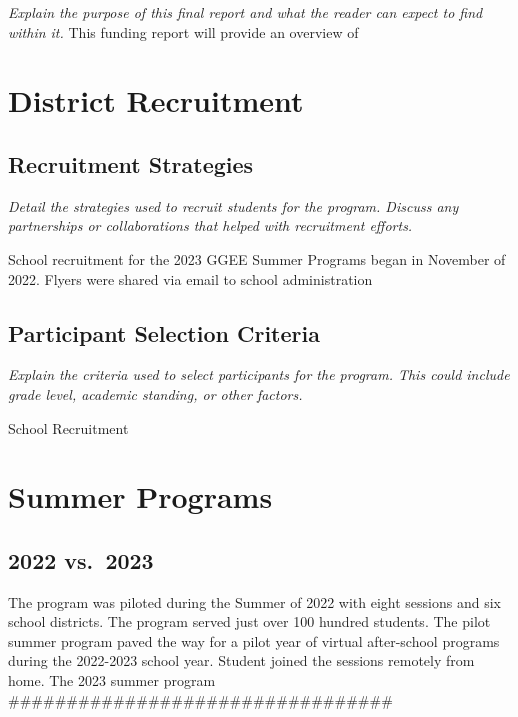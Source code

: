 \documentclass[
]{article}
\begin{document}
\emph{Explain the purpose of this final report and what the reader can
expect to find within it.} This funding report will provide an overview
of

\hypertarget{district-recruitment}{%
\section{District Recruitment}\label{district-recruitment}}

\hypertarget{recruitment-strategies}{%
\subsection{Recruitment Strategies}\label{recruitment-strategies}}

\emph{Detail the strategies used to recruit students for the program.
Discuss any partnerships or collaborations that helped with recruitment
efforts.}

School recruitment for the 2023 GGEE Summer Programs began in November
of 2022. Flyers were shared via email to school administration

\hypertarget{participant-selection-criteria}{%
\subsection{Participant Selection
Criteria}\label{participant-selection-criteria}}

\emph{Explain the criteria used to select participants for the program.
This could include grade level, academic standing, or other factors.}

School Recruitment

\hypertarget{summer-programs}{%
\section{Summer Programs}\label{summer-programs}}

\hypertarget{vs.-2023}{%
\subsection{2022 vs.~2023}\label{vs.-2023}}

The program was piloted during the Summer of 2022 with eight sessions
and six school districts. The program served just over 100 hundred
students. The pilot summer program paved the way for a pilot year of
virtual after-school programs during the 2022-2023 school year. Student
joined the sessions remotely from home. The 2023 summer program
\#\#\#\#\#\#\#\#\#\#\#\#\#\#\#\#\#\#\#\#\#\#\#\#\#\#\#\#\#\#\#\#\#
\end{document}
